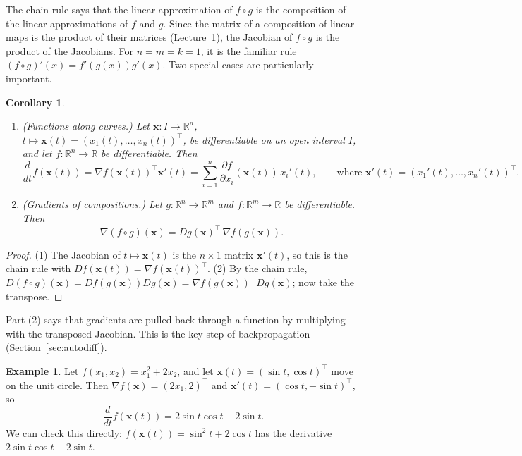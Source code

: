 \documentclass[11pt]{article}
\theoremstyle{definition}
\newtheorem{example}[definition]{Example}
\theoremstyle{plain}
\newtheorem{corollary}[definition]{Corollary}
\theoremstyle{remark}
\begin{document}
The chain rule says that the linear approximation of $f \circ g$ is the composition of the linear approximations of $f$ and $g$. Since the matrix of a composition of linear maps is the product of their matrices (Lecture~1), the Jacobian of $f \circ g$ is the product of the Jacobians. For $n = m = k = 1$, it is the familiar rule $(f \circ g)'(x) = f'(g(x)) g'(x)$. Two special cases are particularly important.

\begin{corollary}\label{cor:chain-special}
    \begin{enumerate}
        \item (Functions along curves.) Let $\mathbf{x}: I \to \mathbb{R}^n$, $t \mapsto \mathbf{x}(t) = (x_1(t), \ldots, x_n(t))^\top$, be differentiable on an open interval $I$, and let $f: \mathbb{R}^n \to \mathbb{R}$ be differentiable. Then
        \[\frac{d}{dt} f(\mathbf{x}(t)) = \nabla f(\mathbf{x}(t))^\top \mathbf{x}'(t) = \sum_{i=1}^n \frac{\partial f}{\partial x_i}(\mathbf{x}(t)) \, x_i'(t), \qquad \text{where } \mathbf{x}'(t) = (x_1'(t), \ldots, x_n'(t))^\top.\]
        \item (Gradients of compositions.) Let $g: \mathbb{R}^n \to \mathbb{R}^m$ and $f: \mathbb{R}^m \to \mathbb{R}$ be differentiable. Then
        \[\nabla (f \circ g)(\mathbf{x}) = Dg(\mathbf{x})^\top \, \nabla f(g(\mathbf{x})).\]
    \end{enumerate}
\end{corollary}

\begin{proof}
    (1) The Jacobian of $t \mapsto \mathbf{x}(t)$ is the $n \times 1$ matrix $\mathbf{x}'(t)$, so this is the chain rule with $D f(\mathbf{x}(t)) = \nabla f(\mathbf{x}(t))^\top$. (2) By the chain rule, $D(f \circ g)(\mathbf{x}) = Df(g(\mathbf{x})) Dg(\mathbf{x}) = \nabla f(g(\mathbf{x}))^\top Dg(\mathbf{x})$; now take the transpose.
\end{proof}

Part (2) says that gradients are pulled back through a function by multiplying with the transposed Jacobian. This is the key step of backpropagation (Section~\ref{sec:autodiff}).

\begin{example}\label{ex:chain-curve}
    Let $f(x_1, x_2) = x_1^2 + 2x_2$, and let $\mathbf{x}(t) = (\sin t, \cos t)^\top$ move on the unit circle. Then $\nabla f(\mathbf{x}) = (2x_1, 2)^\top$ and $\mathbf{x}'(t) = (\cos t, -\sin t)^\top$, so
    \[\frac{d}{dt} f(\mathbf{x}(t)) = 2\sin t \cos t - 2\sin t.\]
    We can check this directly: $f(\mathbf{x}(t)) = \sin^2 t + 2\cos t$ has the derivative $2\sin t \cos t - 2\sin t$.
\end{example}
\end{document}
